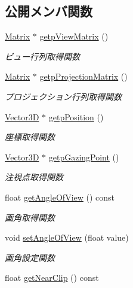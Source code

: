 \subsection*{公開メンバ関数}
\begin{DoxyCompactItemize}
\item 
\mbox{\hyperlink{class_matrix}{Matrix}} $\ast$ \mbox{\hyperlink{class_camera_a754251a0c028649cc5ca1b58efa41886}{getp\+View\+Matrix}} ()
\begin{DoxyCompactList}\small\item\em ビュー行列取得関数 \end{DoxyCompactList}\item 
\mbox{\hyperlink{class_matrix}{Matrix}} $\ast$ \mbox{\hyperlink{class_camera_a68b2c96bfda62c6d8e6a77e38c396e8a}{getp\+Projection\+Matrix}} ()
\begin{DoxyCompactList}\small\item\em プロジェクション行列取得関数 \end{DoxyCompactList}\item 
\mbox{\hyperlink{class_vector3_d}{Vector3D}} $\ast$ \mbox{\hyperlink{class_camera_a3384dbae97724934c5083740a30f4a98}{getp\+Position}} ()
\begin{DoxyCompactList}\small\item\em 座標取得関数 \end{DoxyCompactList}\item 
\mbox{\hyperlink{class_vector3_d}{Vector3D}} $\ast$ \mbox{\hyperlink{class_camera_a26d0234a29c2617960b3d07c1064f8d0}{getp\+Gazing\+Point}} ()
\begin{DoxyCompactList}\small\item\em 注視点取得関数 \end{DoxyCompactList}\item 
float \mbox{\hyperlink{class_camera_a19d2d19ddd9307c66075c83e515bda57}{get\+Angle\+Of\+View}} () const
\begin{DoxyCompactList}\small\item\em 画角取得関数 \end{DoxyCompactList}\item 
void \mbox{\hyperlink{class_camera_a8c9073240eb8385fec51d3ef185d3cee}{set\+Angle\+Of\+View}} (float value)
\begin{DoxyCompactList}\small\item\em 画角設定関数 \end{DoxyCompactList}\item 
float \mbox{\hyperlink{class_camera_a85236e6f5584c5123251664ff7b848d9}{get\+Near\+Clip}} () const

\end{DoxyCompactItemize}
